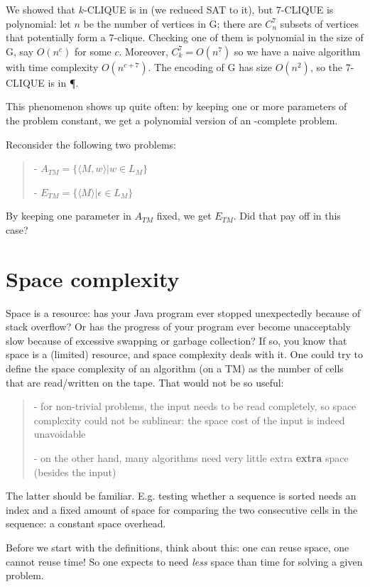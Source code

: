 We showed that $k$-CLIQUE is in \NPC (we reduced SAT to it), but
7-CLIQUE is polynomial: let $n$ be the number of vertices in G; there
are $C_n^7$ subsets of vertices that potentially form a
7-clique. Checking one of them is polynomial in the size of G, say
$O(n^c)$ for some $c$. Moreover, $C_k^7 = O(n^7)$ so we have a naive
algorithm with time complexity $O(n^{c+7})$. The encoding of G has
size $O(n^2)$, so the 7-CLIQUE is in \P.

This phenomenon shows up quite often: by keeping one or more
parameters of the problem constant, we get a polynomial version of an
\NP-complete problem.

Reconsider the following two problems:

\begin{verse}
- $A_{TM} = \{\langle M,w \rangle| w \in L_M\}$

- $E_{TM} = \{\langle M \rangle| \epsilon \in L_M\}$
\end{verse}

By keeping one parameter in $A_{TM}$ fixed, we get $E_{TM}$. Did that
pay off in this case?



\section{Space complexity}

Space is a resource: has your Java program ever stopped unexpectedly
because of stack overflow? Or has the progress of your program ever
become unacceptably slow because of excessive swapping or garbage
collection? If so, you know that space is a (limited) resource, and
space complexity deals with it. One could try to define the space
complexity of an algorithm (on a TM) as the number of cells that are
read/written on the tape. That would not be so useful:
\begin{verse}
- for non-trivial problems, the input needs to be read completely, so
space complexity could not be sublinear: the space cost of the input
is indeed unavoidable

- on the other hand, many algorithms need very little extra {\bf
extra} space (besides the input)
\end{verse}

The latter should be familiar. E.g. testing whether a sequence is
sorted needs an index and a fixed amount of space for comparing the
two consecutive cells in the sequence: a constant space overhead.

Before we start with the definitions, think about this: one can reuse
space, one cannot reuse time! So one expects to need {\em less} space
than time for solving a given problem.

